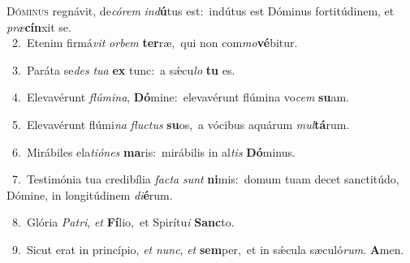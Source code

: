 \lettrine{\initial\textcolor{\initialcolor}{D}}{óminus} regnávit, de\-\textit{có}\-\textit{rem} \textit{ind}\-\textbf{ú}tus est:~\star indútus est Dóminus fortitúdinem, et \textit{præ}\-\textbf{cín}xit se.\\
{\numbfont\textcolor{\numbcolor}{~2.}}~Etenim firmá\textit{vit} \textit{or}\-\textit{bem} \textbf{ter}\-ræ,~\star qui non com\-\textit{mo}\-\textbf{vé}bitur.\par
{\numbfont\textcolor{\numbcolor}{~3.}}~Paráta se\textit{des} \textit{tu}\-\textit{a} \textbf{ex} tunc:~\star a sǽcu\textit{lo} \textbf{tu} es.\par
{\numbfont\textcolor{\numbcolor}{~4.}}~Elevavérunt \textit{flú}\-\textit{mi}\textit{na}, \textbf{Dó}\-mine:~\star elevavérunt flúmina vo\textit{cem} \textbf{su}\-am.\par
{\numbfont\textcolor{\numbcolor}{~5.}}~Elevavérunt flúmi\textit{na} \textit{fluc}\-\textit{tus} \textbf{su}\-os,~\star a vócibus aquárum \textit{mul}\-\textbf{tá}rum.\par
{\numbfont\textcolor{\numbcolor}{~6.}}~Mirábiles ela\-\textit{ti}\-\textit{ó}\textit{nes} \textbf{ma}\-ris:~\star mirábilis in al\textit{tis} \textbf{Dó}\-minus.\par
{\numbfont\textcolor{\numbcolor}{~7.}}~Testimónia tua credibília \textit{fac}\-\textit{ta} \textit{sunt} \textbf{ni}\-mis:~\star domum tuam decet sanctitúdo, Dómine, in longitúdinem \textit{di}\-\textbf{é}rum.\par
{\numbfont\textcolor{\numbcolor}{~8.}}~Glória \textit{Pa}\-\textit{tri}, \textit{et} \textbf{Fí}\-lio,~\star et Spirítu\textit{i} \textbf{Sanc}\-to.\par
{\numbfont\textcolor{\numbcolor}{~9.}}~Sicut erat in princípio, \textit{et} \textit{nunc}\-, \textit{et} \textbf{sem}\-per,~\star et in sǽcula sæculó\-\textit{rum}\-. \textbf{A}\-men.\par
